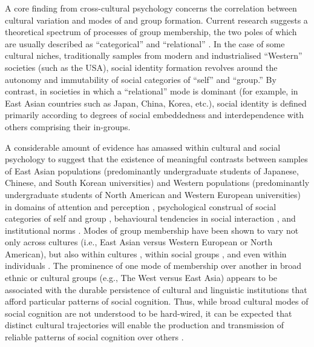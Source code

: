 \begin{CJK}{UTF8}{gbsn}
A core finding from cross-cultural psychology concerns the correlation between cultural variation and modes of and group formation.  Current research suggests a theoretical spectrum of processes of group membership, the two poles of which are usually described as ``categorical'' and ``relational'' \citep{Hofstede1980,Brewer2007}.
In the case of some cultural niches, traditionally samples from modern and industrialised ``Western'' societies (such as the USA), social identity formation revolves around the autonomy and immutability of social categories of ``self'' and ``group.''  By contrast, in societies in which a ``relational'' mode is dominant (for example, in East Asian countries such as Japan, China, Korea, etc.), social identity is defined primarily according to degrees of social embeddedness and interdependence with others comprising their in-groups\citep{Leung2012}.

A considerable amount of evidence has amassed within cultural and social psychology to suggest that the existence of meaningful contrasts between samples of East Asian populations (predominantly undergraduate students of Japanese, Chinese, and South Korean universities) and Western populations (predominantly undergraduate students of North American and Western European universities) in domains of attention and perception \citep{Peng1997,Nisbett2003}, psychological construal of social categories of self and group \citep{Markus1991}, behavioural tendencies in social interaction \citep{Yuki2003}, and institutional norms \citep{Liu2017}.
Modes of group membership have been shown to vary not only across cultures (i.e., East Asian versus Western European or North American), but also within cultures \citep{Henrich2014}, within social groups \citep[according to sex and personality differences, see][]{Yuki2014}, and even within individuals \citep[depending on contextual and situational primes, see][]{Lee2014,Wong2005}.  The prominence of one mode of membership over another in broad ethnic or cultural groups (e.g., The West versus East Asia) appears to be associated with the durable persistence of cultural and linguistic institutions that afford particular patterns of social cognition. Thus, while broad cultural modes of social cognition are not understood to be hard-wired, it can be expected that distinct cultural trajectories will enable the production and transmission of reliable patterns of social cognition over others \citep{Claidiere2014,Mesoudi2015}.


\end{CJK}
